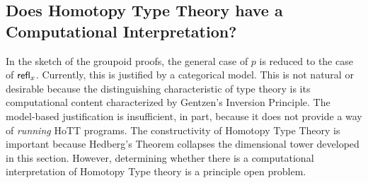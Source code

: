 \documentclass[12pt]{article}
\begin{document}
\subsection{Does Homotopy Type Theory have a Computational Interpretation?}

In the sketch of the groupoid proofs, the general case of $p$ is reduced to
the case of $\mathsf{refl}_{x}$.  Currently, this is justified
by a categorical model.  This is not natural or desirable because the 
distinguishing characteristic
of type theory is its computational content characterized by Gentzen's Inversion
Principle.
The model-based justification is insufficient, in part, because it does not provide
a way of \emph{running} HoTT programs.
The constructivity of Homotopy Type Theory is important because Hedberg's Theorem
collapses the dimensional tower developed in this section. However, determining
whether there is a computational interpretation of Homotopy Type theory is
a principle open problem.




\end{document}
